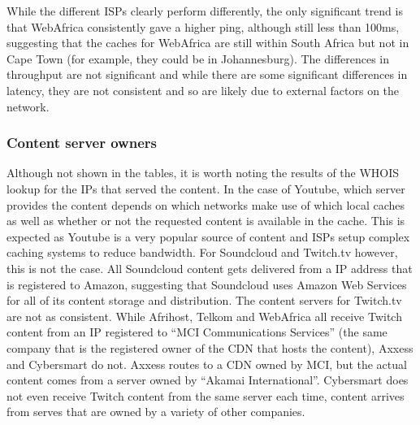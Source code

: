 \documentclass{sig-alternate-05-2015}
\begin{document}
\begin{table}
	\caption{Offset from median throughput (KB/s, higher is better)}
	\label{table:OffsetFromMedianThroughput}
\end{table}
While the different ISPs clearly perform differently, the only significant trend is that WebAfrica consistently gave a higher ping, although still less than 100ms, suggesting that the caches for WebAfrica are still within South Africa but not in Cape Town (for example, they could be in Johannesburg). 
The differences in throughput are not significant and while there are some significant differences in latency, they are not consistent and so are likely due to external factors on the network.

\subsubsection{Content server owners}
Although not shown in the tables, it is worth noting the results of the WHOIS lookup for the IPs that served the content. In the case of Youtube, which server provides the content depends on which networks make use of which local caches as well as whether or not the requested content is available in the cache. This is expected as Youtube is a very popular source of content and ISPs setup complex caching systems to reduce bandwidth. For Soundcloud and Twitch.tv however, this is not the case. All Soundcloud content gets delivered from a IP address that is registered to Amazon, suggesting that Soundcloud uses Amazon Web Services for all of its content storage and distribution. The content servers for Twitch.tv are not as consistent. While Afrihost, Telkom and WebAfrica all receive Twitch content from an IP registered to ``MCI Communications Services'' (the same company that is the registered owner of the CDN that hosts the content), Axxess and Cybersmart do not. Axxess routes to a CDN owned by MCI, but the actual content comes from a server owned by ``Akamai International''. Cybersmart does not even receive Twitch content from the same server each time, content arrives from serves that are owned by a variety of other companies.
\end{document}
